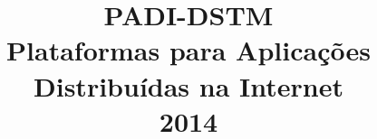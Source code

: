 \documentclass[times, 10pt,twocolumn]{article}
\begin{document}
\title{\huge{PADI-DSTM} \\[0,1in] \textmd{Plataformas para Aplicações Distribuídas na Internet \\[0,05in] 2014}}

\maketitle
\thispagestyle{empty}

\begin{abstract}

\end{abstract}









\nocite{ex1,ex2}


\end{document}
